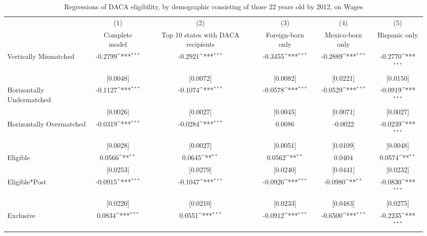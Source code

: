 \begin{table}[htbp]\centering
\def\sym#1{\ifmmode^{#1}\else\(^{#1}\)\fi}
\caption{Regressions of DACA eligibility, by demographic consisting of those 22 years old by 2012, on Wages}
\begin{tabular}{l*{5}{c}}
\toprule
                    &\multicolumn{1}{c}{(1)}         &\multicolumn{1}{c}{(2)}         &\multicolumn{1}{c}{(3)}         &\multicolumn{1}{c}{(4)}         &\multicolumn{1}{c}{(5)}         \\
                    &Complete model         &Top 10 states with DACA recipients         &Foreign-born only         &Mexico-born only         &Hispanic only         \\
\midrule
Vertically Mismatched&     -0.2799\sym{***}&     -0.2921\sym{***}&     -0.3455\sym{***}&     -0.2889\sym{***}&     -0.2770\sym{***}\\
                    &    [0.0048]         &    [0.0072]         &    [0.0082]         &    [0.0221]         &    [0.0150]         \\
\addlinespace
Horizontally Undermatched&     -0.1127\sym{***}&     -0.1074\sym{***}&     -0.0578\sym{***}&     -0.0529\sym{***}&     -0.0919\sym{***}\\
                    &    [0.0026]         &    [0.0027]         &    [0.0045]         &    [0.0071]         &    [0.0027]         \\
\addlinespace
Horizontally Overmatched&     -0.0319\sym{***}&     -0.0284\sym{***}&      0.0086         &     -0.0022         &     -0.0239\sym{***}\\
                    &    [0.0028]         &    [0.0027]         &    [0.0051]         &    [0.0109]         &    [0.0048]         \\
\addlinespace
Eligible            &      0.0566\sym{**} &      0.0645\sym{**} &      0.0562\sym{**} &      0.0404         &      0.0574\sym{**} \\
                    &    [0.0253]         &    [0.0279]         &    [0.0240]         &    [0.0441]         &    [0.0232]         \\
\addlinespace
Eligible*Post       &     -0.0915\sym{***}&     -0.1047\sym{***}&     -0.0926\sym{***}&     -0.0980\sym{**} &     -0.0830\sym{***}\\
                    &    [0.0220]         &    [0.0210]         &    [0.0233]         &    [0.0483]         &    [0.0275]         \\
\addlinespace
Exclusive           &      0.0834\sym{***}&      0.0551\sym{***}&     -0.0912\sym{***}&     -0.6500\sym{***}&     -0.2235\sym{***}\\

\end{tabular}
\end{table}

